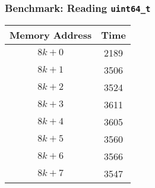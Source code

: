 \begin{frame}
  \frametitle{Benchmark: Reading \texttt{uint64\_t}}
  \begin{center}
    \begin{tabular}{cc}
      \textbf{Memory Address} & \textbf{Time} \\
      \toprule
      $8k+0$ & 2189 \\
      $8k+1$ & 3506 \\
      $8k+2$ & 3524 \\
      $8k+3$ & 3611 \\
      $8k+4$ & 3605 \\
      $8k+5$ & 3560 \\
      $8k+6$ & 3566 \\
      $8k+7$ & 3547 \\
    \end{tabular}
  \end{center}
\end{frame}

